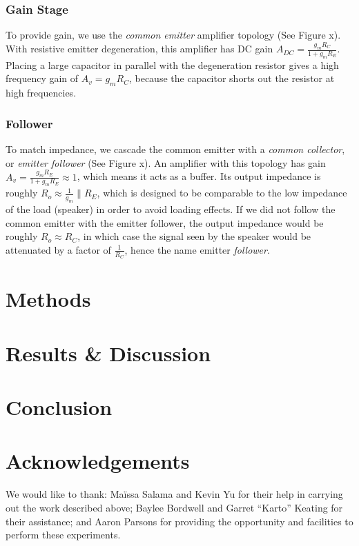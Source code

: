 \documentclass[11pt]{article}
\begin{document}
        \subsubsection{Gain Stage}
        To provide gain, we use the \emph{common emitter} amplifier topology (See Figure x). With resistive emitter degeneration, this amplifier has DC gain $A_{DC} = \frac{g_m R_C}{1 + g_m R_E}$. Placing a large capacitor in parallel with the degeneration resistor gives a high frequency gain of $A_v = g_m R_C$, because the capacitor shorts out the resistor at high frequencies.

        \subsubsection{Follower}
        To match impedance, we cascade the common emitter with a \emph{common collector}, or \emph{emitter follower} (See Figure x). An amplifier with this topology has gain $A_v = \frac{g_m R_E}{1 + g_m R_E} \approx 1$, which means it acts as a buffer. Its output impedance is roughly $R_o \approx \frac{1}{g_m} \parallel R_E$, which is designed to be comparable to the low impedance of the load (speaker) in order to avoid loading effects. If we did not follow the common emitter with the emitter follower, the output impedance would be roughly $R_o \approx R_C$, in which case the signal seen by the speaker would be attenuated by a factor of $\frac{1}{R_C}$, hence the name emitter \emph{follower}.

\section{Methods}

\section{Results \& Discussion}

\section{Conclusion}

\section{Acknowledgements}
We would like to thank: Ma\"{i}ssa Salama and Kevin Yu for their help in carrying out the work described above; Baylee Bordwell and Garret ``Karto'' Keating for their assistance; and Aaron Parsons for providing the opportunity and facilities to perform these experiments.
\end{document}
